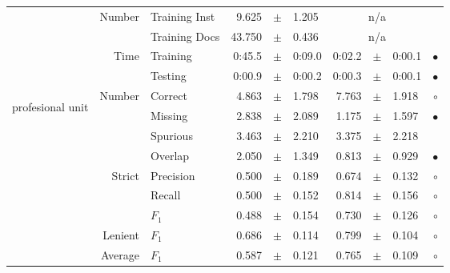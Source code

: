 \begin{longtable}{|r|r|l||rcl|rcl|c|}
\cline{2-10} & \multirow{2}{*}{    Number} &   Training Inst &       9.625 &  $\pm$  &       1.205 &    \multicolumn{3}{c|}{n/a}         &  \\
\cline{3-10} &                             &   Training Docs &      43.750 &  $\pm$  &       0.436 &    \multicolumn{3}{c|}{n/a}         &  \\
\cline{2-10} & \multirow{2}{*}{      Time} &        Training &      0:45.5 &  $\pm$  &      0:09.0 &      0:02.2 &  $\pm$  &      0:00.1 & $\bullet$ \\
\cline{3-10} &                             &         Testing &      0:00.9 &  $\pm$  &      0:00.2 &      0:00.3 &  $\pm$  &      0:00.1 & $\bullet$ \\
\hline
\hline
\multirow{11}{*}{\begin{sideways}profesional unit\end{sideways} }
             & \multirow{4}{*}{    Number} &         Correct &       4.863 &  $\pm$  &       1.798 &       7.763 &  $\pm$  &       1.918 & $\circ$ \\
\cline{3-10} &                             &         Missing &       2.838 &  $\pm$  &       2.089 &       1.175 &  $\pm$  &       1.597 & $\bullet$ \\
\cline{3-10} &                             &        Spurious &       3.463 &  $\pm$  &       2.210 &       3.375 &  $\pm$  &       2.218 &  \\
\cline{3-10} &                             &         Overlap &       2.050 &  $\pm$  &       1.349 &       0.813 &  $\pm$  &       0.929 & $\bullet$ \\
\cline{2-10} & \multirow{3}{*}{    Strict} &       Precision &       0.500 &  $\pm$  &       0.189 &       0.674 &  $\pm$  &       0.132 & $\circ$ \\
\cline{3-10} &                             &          Recall &       0.500 &  $\pm$  &       0.152 &       0.814 &  $\pm$  &       0.156 & $\circ$ \\
\cline{3-10} &                             &           $F_1$ &       0.488 &  $\pm$  &       0.154 &       0.730 &  $\pm$  &       0.126 & $\circ$ \\
\cline{2-10} &                     Lenient &           $F_1$ &       0.686 &  $\pm$  &       0.114 &       0.799 &  $\pm$  &       0.104 & $\circ$ \\
\cline{2-10} &                     Average &           $F_1$ &       0.587 &  $\pm$  &       0.121 &       0.765 &  $\pm$  &       0.109 & $\circ$ \\

\end{longtable}
